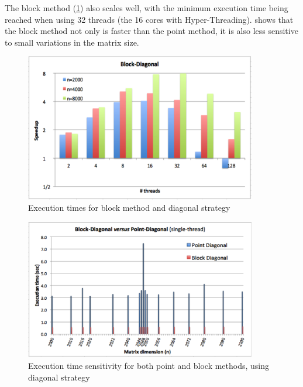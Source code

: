 \documentclass[../thesis]{subfiles}
\begin{document}
	The block method (\cref{fig:multicore:block:diagonal:times}) also scales well, with the minimum execution time being reached when using 32 threads (the 16 cores with Hyper-Threading).  shows that the block method not only is faster than the point method, it is also less sensitive to small variations in the matrix size.

	\begin{figure}[hp]
		\begin{center}
			\includegraphics[width=0.9\textwidth]{assets/images/multicore/block-diagonal.png}
		\end{center}
		\caption{Execution times for block method and diagonal strategy}
		\label{fig:multicore:block:diagonal:times}
	\end{figure}

	\begin{figure}[hp]
		\begin{center}
			\includegraphics[width=0.9\textwidth]{assets/images/multicore/matrix-variations.png}
		\end{center}
		\caption{Execution time sensitivity for both point and block methods, using diagonal strategy}
		\label{fig:multicore:sensitivity}
	\end{figure}
\end{document}
